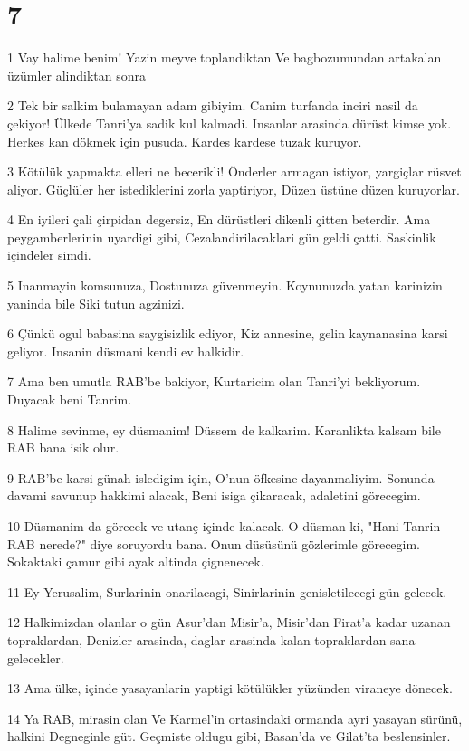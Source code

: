 \chapter{7}

\par 1 Vay halime benim! Yazin meyve toplandiktan Ve bagbozumundan artakalan üzümler alindiktan sonra
\par 2 Tek bir salkim bulamayan adam gibiyim. Canim turfanda inciri nasil da çekiyor! Ülkede Tanri'ya sadik kul kalmadi. Insanlar arasinda dürüst kimse yok. Herkes kan dökmek için pusuda. Kardes kardese tuzak kuruyor.
\par 3 Kötülük yapmakta elleri ne becerikli! Önderler armagan istiyor, yargiçlar rüsvet aliyor. Güçlüler her istediklerini zorla yaptiriyor, Düzen üstüne düzen kuruyorlar.
\par 4 En iyileri çali çirpidan degersiz, En dürüstleri dikenli çitten beterdir. Ama peygamberlerinin uyardigi gibi, Cezalandirilacaklari gün geldi çatti. Saskinlik içindeler simdi.
\par 5 Inanmayin komsunuza, Dostunuza güvenmeyin. Koynunuzda yatan karinizin yaninda bile Siki tutun agzinizi.
\par 6 Çünkü ogul babasina saygisizlik ediyor, Kiz annesine, gelin kaynanasina karsi geliyor. Insanin düsmani kendi ev halkidir.
\par 7 Ama ben umutla RAB'be bakiyor, Kurtaricim olan Tanri'yi bekliyorum. Duyacak beni Tanrim.
\par 8 Halime sevinme, ey düsmanim! Düssem de kalkarim. Karanlikta kalsam bile RAB bana isik olur.
\par 9 RAB'be karsi günah isledigim için, O'nun öfkesine dayanmaliyim. Sonunda davami savunup hakkimi alacak, Beni isiga çikaracak, adaletini görecegim.
\par 10 Düsmanim da görecek ve utanç içinde kalacak. O düsman ki, "Hani Tanrin RAB nerede?" diye soruyordu bana. Onun düsüsünü gözlerimle görecegim. Sokaktaki çamur gibi ayak altinda çignenecek.
\par 11 Ey Yerusalim, Surlarinin onarilacagi, Sinirlarinin genisletilecegi gün gelecek.
\par 12 Halkimizdan olanlar o gün Asur'dan Misir'a, Misir'dan Firat'a kadar uzanan topraklardan, Denizler arasinda, daglar arasinda kalan topraklardan sana gelecekler.
\par 13 Ama ülke, içinde yasayanlarin yaptigi kötülükler yüzünden viraneye dönecek.
\par 14 Ya RAB, mirasin olan Ve Karmel'in ortasindaki ormanda ayri yasayan sürünü, halkini Degneginle güt. Geçmiste oldugu gibi, Basan'da ve Gilat'ta beslensinler.
